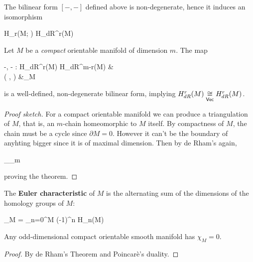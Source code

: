 \documentclass[main.tex]{subfiles}
\begin{document}
\begin{theorem}[de Rham]
\label{th:de_rham}
	The bilinear form $[-,-]$ defined above is non-degenerate, hence it induces an isomorphism
	\begin{eqalign}
		H_r(M; \R) \isoin{\Vec} H_{dR}^r(M)
	\end{eqalign}
\end{theorem}

\begin{theorem}
	Let $M$ be a \emph{compact} orientable manifold of dimension $m$. The map
	\begin{eqalign}
		\langle -, - \rangle : H_{dR}^r(M) \times H_{dR}^{m-r}(M) &\longto \R\\
		( \overline \omega, \overline \eta) &\longmapsto \int_M \omega \wedge \eta
	\end{eqalign}
	is a well-defined, non-degenerate bilinear form, implying $H_{dR}^r(M) \isoin\Vec H_{dR}^r(M)$.
\end{theorem}
\begin{proof}[Proof sketch]
	For a compact orientable manifold we can produce a triangulation of $M$, that is, an $m$-chain homeomorphic to $M$ itself. By compactness of $M$, the chain must be a cycle since $\partial M = 0$. However it can't be the boundary of anyhting bigger since it is of maximal dimension. Then by de Rham's again,
	\begin{eqalign}
		\int_{\Delta_m} \omega \wedge \eta \neq 0
	\end{eqalign}
	proving the theorem.
\end{proof}

\begin{definition}
	The \textbf{Euler characteristic} of $M$ is the alternating sum of the dimensions of the homology groups of $M$:
	\begin{eqalign}
		\chi_M = \sum_{n=0}^{\dim M} (-1)^n \dim H_n(M)
	\end{eqalign}
\end{definition}

\begin{corollary}
	Any odd-dimensional compact orientable smooth manifold has $\chi_M = 0$.
\end{corollary}
\begin{proof}
	By de Rham's Theorem and Poincarè's duality.
\end{proof}
\end{document}
